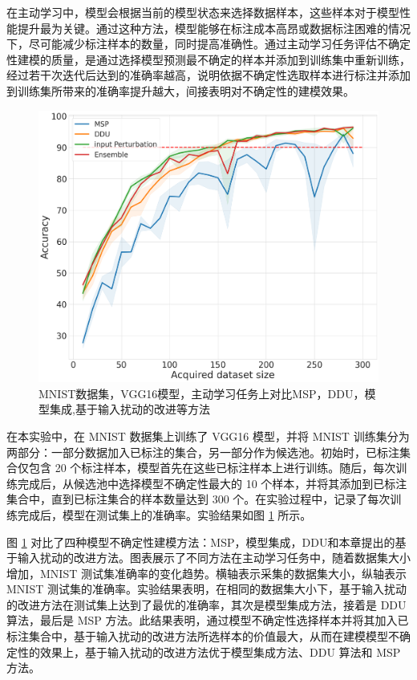 在主动学习中，模型会根据当前的模型状态来选择数据样本，这些样本对于模型性能提升最为关键。通过这种方法，模型能够在标注成本高昂或数据标注困难的情况下，尽可能减少标注样本的数量，同时提高准确性。通过主动学习任务评估不确定性建模的质量，是通过选择模型预测最不确定的样本并添加到训练集中重新训练，经过若干次迭代后达到的准确率越高，说明依据不确定性选取样本进行标注并添加到训练集所带来的准确率提升越大，间接表明对不确定性的建模效果。

\begin{figure}[h]
    \captionsetup{font=small, justification=centering}
    \centering
    \includegraphics[width=0.75\linewidth]{assets/mnist_test_accuracy_active_learning.png}
    \caption{MNIST数据集，VGG16模型，主动学习任务上对比MSP，DDU，模型集成,基于输入扰动的改进等方法}
    \label{fig:active learning}
\end{figure}
在本实验中，在 MNIST 数据集上训练了 VGG16 模型，并将 MNIST 训练集分为两部分：一部分数据加入已标注的集合，另一部分作为候选池。初始时，已标注集合仅包含 20 个标注样本，模型首先在这些已标注样本上进行训练。随后，每次训练完成后，从候选池中选择模型不确定性最大的 10 个样本，并将其添加到已标注集合中，直到已标注集合的样本数量达到 300 个。在实验过程中，记录了每次训练完成后，模型在测试集上的准确率。实验结果如图 \ref{fig:active learning} 所示。

图 \ref{fig:active learning} 对比了四种模型不确定性建模方法：MSP，模型集成，DDU和本章提出的基于输入扰动的改进方法。图表展示了不同方法在主动学习任务中，随着数据集大小增加，MNIST 测试集准确率的变化趋势。横轴表示采集的数据集大小，纵轴表示 MNIST 测试集的准确率。实验结果表明，在相同的数据集大小下，基于输入扰动的改进方法在测试集上达到了最优的准确率，其次是模型集成方法，接着是 DDU 算法，最后是 MSP 方法。此结果表明，通过模型不确定性选择样本并将其加入已标注集合中，基于输入扰动的改进方法所选样本的价值最大，从而在建模模型不确定性的效果上，基于输入扰动的改进方法优于模型集成方法、DDU 算法和 MSP 方法。

